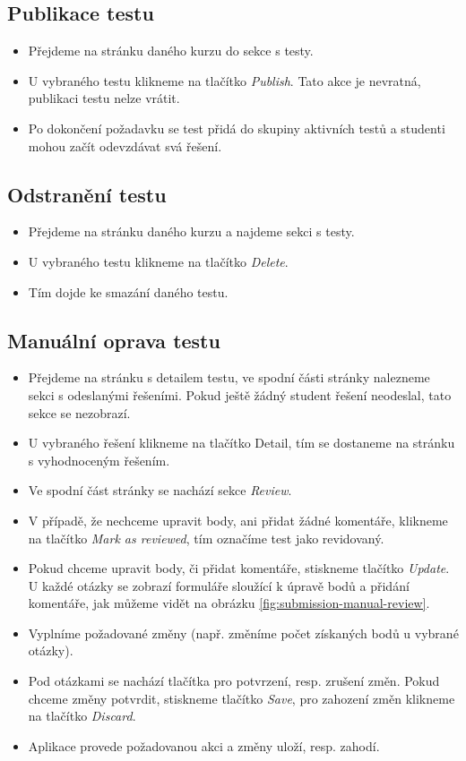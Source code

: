 \subsection{Publikace testu}
\begin{itemize}
	\item Přejdeme na stránku daného kurzu do sekce s testy.
	\item U vybraného testu klikneme na tlačítko \textit{Publish}. Tato akce je nevratná, publikaci testu nelze vrátit.
	\item Po dokončení požadavku se test přidá do skupiny aktivních testů a studenti mohou začít odevzdávat svá řešení.
\end{itemize}

\subsection{Odstranění testu}
\begin{itemize}
	\item Přejdeme na stránku daného kurzu a najdeme sekci s testy.
	\item U vybraného testu klikneme na tlačítko \textit{Delete}.
	\item Tím dojde ke smazání daného testu.
\end{itemize}

\subsection{Manuální oprava testu}
\begin{itemize}
	\item Přejdeme na stránku s detailem testu, ve spodní části stránky nalezneme sekci s odeslanými řešeními. Pokud ještě žádný student řešení neodeslal, tato sekce se nezobrazí.
	\item U vybraného řešení klikneme na tlačítko Detail, tím se dostaneme na stránku s vyhodnoceným řešením.
	\item Ve spodní část stránky se nachází sekce \textit{Review}.
	\item V případě, že nechceme upravit body, ani přidat žádné komentáře, klikneme na tlačítko \textit{Mark as reviewed}, tím označíme test jako revidovaný.
	\item Pokud chceme upravit body, či přidat komentáře, stiskneme tlačítko \textit{Update}. U každé otázky se zobrazí formuláře sloužící k úpravě bodů a přidání komentáře, jak můžeme vidět na obrázku \ref{fig:submission-manual-review}.
	\item Vyplníme požadované změny (např. změníme počet získaných bodů u vybrané otázky).
	\item Pod otázkami se nachází tlačítka pro potvrzení, resp. zrušení změn. Pokud chceme změny potvrdit, stiskneme tlačítko \textit{Save}, pro zahození změn klikneme na tlačítko \textit{Discard}.
	\item Aplikace provede požadovanou akci a změny uloží, resp. zahodí.
\end{itemize}

